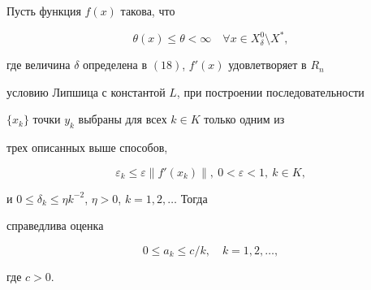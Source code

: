 \begin{thm}


Пусть функция $f(x)$ такова, что 


\begin{equation}


\theta (x)\leq \theta <\infty \quad


\forall x\in X^{0}_{\delta }\setminus X^{*},


\end{equation}


где величина $\delta$ определена в $(18)$, $f'(x)$ удовлетворяет в $R_n$


условию Липшица с константой $L$, при построении последовательности


$\{x_k\}$ точки $y_k$ выбраны для всех $k\in K$ только одним из


трех описанных выше способов,


\begin{equation}


\varepsilon_k\leq \varepsilon \|f'(x_k)\|,\ 0<\varepsilon <1,


\ k\in K,


\end{equation}


и $0\leq \delta_k\leq \eta k^{-2}$, $\eta >0$, $k=1,2,\dotsc$ Тогда


справедлива оценка


\begin{equation}


0\leq a_k\leq c/k,\quad k=1,2,\dotsc,


\end{equation}


где $c>0$.


\end{thm}





